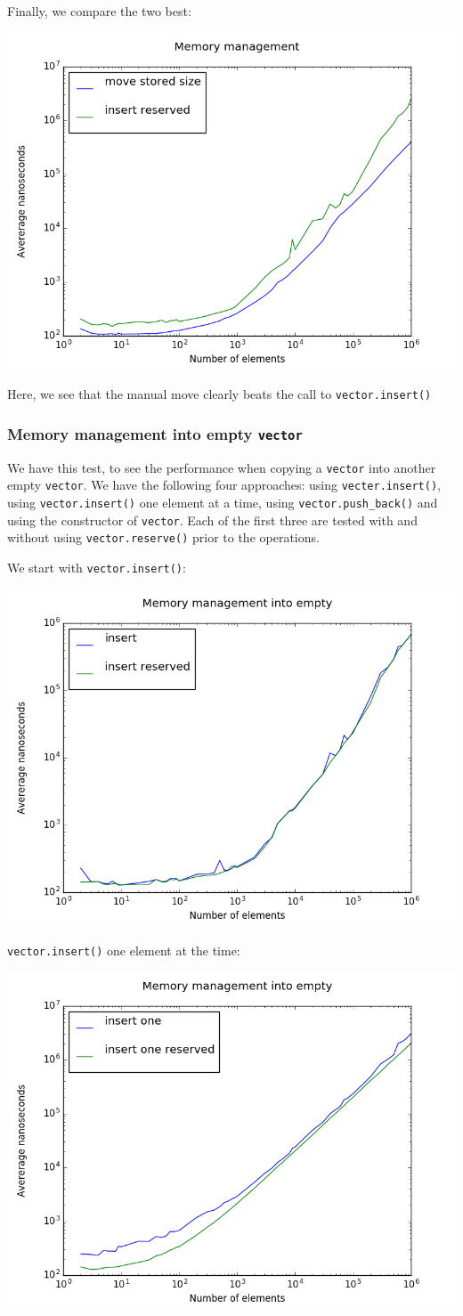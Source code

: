 Finally, we compare the two best:
\begin{center}
\includegraphics[width=.5\linewidth]{graphs/memman_both}
\end{center}
Here, we see that the manual move clearly beats the call to
\texttt{vector.insert()}

\subsubsection{Memory management into empty \texttt{vector}}
We have this test, to see the performance when copying a \texttt{vector} into
another empty \texttt{vector}. We have the following four approaches: using
\texttt{vecter.insert()}, using \texttt{vector.insert()} one element at a time,
using \texttt{vector.push\_back()} and using the constructor of \texttt{vector}.
Each of the first three are tested with and without using
\texttt{vector.reserve()} prior to the operations.

We start with \texttt{vector.insert()}:
\begin{center}
\includegraphics[width=.5\linewidth]{graphs/memmanempty_insert}
\end{center}

\texttt{vector.insert()} one element at the time:
\begin{center}
\includegraphics[width=.5\linewidth]{graphs/memmanempty_insertone}
\end{center}

